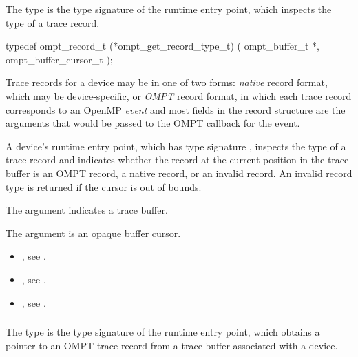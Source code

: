 \summary
The  type is the type signature of the 
 runtime entry point, which inspects the 
type of a trace record.

\format
\begin{ccppspecific}
\begin{omptInquiry}
typedef ompt_record_t (*ompt_get_record_type_t) (
  ompt_buffer_t *,
  ompt_buffer_cursor_t 
);
\end{omptInquiry}
\end{ccppspecific}

\descr
Trace records for a device may be in one of two forms: \emph{native} 
record format, which may be device-specific, or \emph{OMPT} record 
format, in which each trace record corresponds to an OpenMP \emph{event} 
and most fields in the record structure are the arguments that would 
be passed to the OMPT callback for the event.

A device's  runtime entry point, which has
type signature , inspects the type of a 
trace record and indicates whether the record at the current position 
in the trace buffer is an OMPT record, a native record, or an invalid 
record. An invalid record type is returned if the cursor is out of bounds.

\argdesc
The  argument indicates a trace buffer.

The  argument is an opaque buffer cursor.

\crossreferences
\begin{itemize}
\item {}, see .

\item {}, see .

\item {}, see .
\end{itemize}



\subsubsection{}
\label{sec:ompt_get_record_ompt_t}

\summary
The  type is the type signature of the 
 runtime entry point, which obtains a pointer 
to an OMPT trace record from a trace buffer associated with a device.

